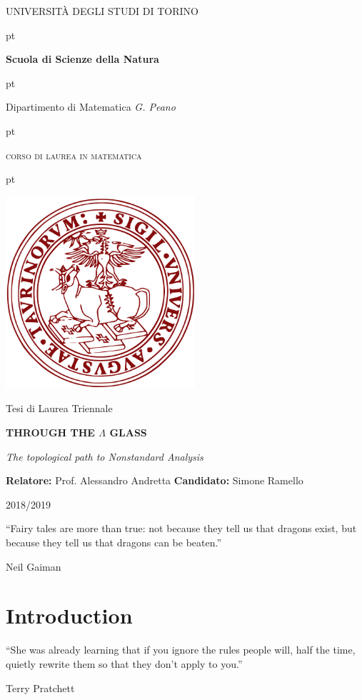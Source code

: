 \documentclass[a4paper,50 pt,titlepage,twoside,colorlinks=true,allcolors=circusroyale4]{book}
\begin{document}
\thispagestyle{empty}
\centerline{\huge{\textsc{\MakeUppercase{Università degli Studi di Torino}}}}

 pt

\centerline {\huge{\textbf{Scuola di Scienze della Natura}}}

 pt

\centerline {\LARGE{Dipartimento di Matematica \textit{G. Peano}}}

 pt

\centerline {\huge{\textsc{corso di laurea in matematica}}}


 pt


\centerline {\includegraphics[width=7cm]{logo}}
\vskip 1.2cm
\centerline {\Large {Tesi di Laurea Triennale}} 

\vskip 0.7cm

\centerline {\huge {\bf THROUGH THE $\Lambda$ GLASS}}
\centerline {\large {\it The topological path to Nonstandard Analysis}}

\vskip 1cm

\noindent \textbf{Relatore:} Prof. Alessandro Andretta
\hfill  {\textbf{Candidato:} Simone Ramello }

\vskip 2.5cm

\centerline{2018/2019}
\newpage
\vspace*{\fill}
\epigraph{  “Fairy tales are more than true: not because they tell us that dragons exist, but because they tell us that dragons can be beaten.”  }{Neil Gaiman}
\vfill
\tableofcontents
\vspace*{\fill}
\pagebreak
\chapter*{Introduction}
\epigraph{ “She was already learning that if you ignore the rules people will, half the time, quietly rewrite them so that they don't apply to you.”}{Terry Pratchett}
	  
\end{document}
